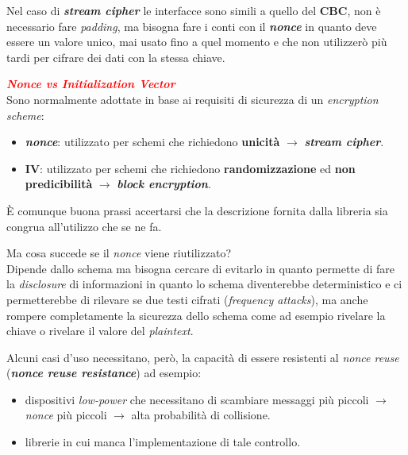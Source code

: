 \begin{flushleft}
    \medskip

    Nel caso di \textbf{\textit{stream cipher}} le interfacce sono simili a quello del \textbf{CBC}, non è necessario fare \textit{padding}, ma bisogna fare i conti con il \textbf{\textit{nonce}} in quanto deve essere un valore unico, mai usato fino a quel momento e che non utilizzerò più tardi per cifrare dei dati con la stessa chiave.
\end{flushleft}

\begin{flushleft}
    \textcolor{red}{\textbf{\textit{Nonce vs Initialization Vector}}} \\
    Sono normalmente adottate in base ai requisiti di sicurezza di un \textit{encryption scheme}:
    \begin{itemize}[nosep]
        \item \textbf{\textit{nonce}}: utilizzato per schemi che richiedono \textbf{unicità} $\rightarrow$ \textbf{\textit{stream cipher}}.
        \item \textbf{IV}: utilizzato per schemi che richiedono \textbf{randomizzazione} ed \textbf{non predicibilità} $\rightarrow$ \textbf{\textit{block encryption}}.
    \end{itemize}
    È comunque buona prassi accertarsi che la descrizione fornita dalla libreria sia congrua all'utilizzo che se ne fa.

    \medskip

    Ma cosa succede se il \textit{nonce} viene riutilizzato? \\
    Dipende dallo schema ma bisogna cercare di evitarlo in quanto permette di fare la \textit{disclosure} di informazioni in quanto lo schema diventerebbe deterministico e ci permetterebbe di rilevare se due testi cifrati (\textit{frequency attacks}), ma anche rompere completamente la sicurezza dello schema come ad esempio rivelare la chiave o rivelare il valore del \textit{plaintext}.

    \medskip

    Alcuni casi d'uso necessitano, però, la capacità di essere resistenti al \textit{nonce reuse} (\textbf{\textit{nonce reuse resistance}}) ad esempio:
    \begin{itemize}[nosep]
        \item dispositivi \textit{low-power} che necessitano di scambiare messaggi più piccoli $\rightarrow$ \textit{nonce} più piccoli $\rightarrow$ alta probabilità di collisione.
        \item librerie in cui manca l'implementazione di tale controllo.
    \end{itemize}


\end{flushleft}
